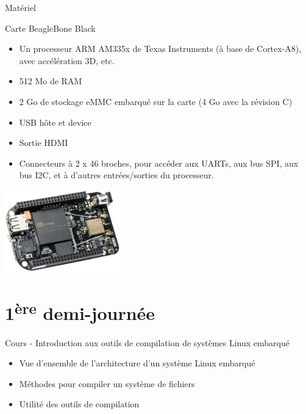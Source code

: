 \documentclass[a4paper,12pt,obeyspaces,spaces,hyphens]{article}
\begin{document}

\feagendatwocolumn
{Matériel}
{
  Carte BeagleBone Black
  \begin{itemize}
  \item Un processeur ARM AM335x de Texas Instruments (à base de
    Cortex-A8), avec accélération 3D, etc.
  \item 512 Mo de RAM
  \item 2 Go de stockage eMMC embarqué sur la carte
	\newline(4 Go avec la révision C)
  \item USB hôte et device
  \item Sortie HDMI
  \item Connecteurs à 2 x 46 broches, pour accéder aux UARTs, aux
        bus SPI, aux bus I2C, et à d'autres entrées/sorties du
        processeur.
  \end{itemize}
}
{}
{
  \begin{flushright}
  \includegraphics[width=5cm]{../slides/beagleboneblack-board/beagleboneblack.png}
  \end{flushright}
}

\section{1\textsuperscript{ère} demi-journée}

\feagendaonecolumn
{Cours - Introduction aux outils de compilation de systèmes Linux embarqué}
{
  \begin{itemize}
  \item Vue d'ensemble de l'architecture d'un système Linux embarqué
  \item Méthodes pour compiler un système de fichiers
  \item Utilité des outils de compilation
  \end{itemize}
}
\end{document}
